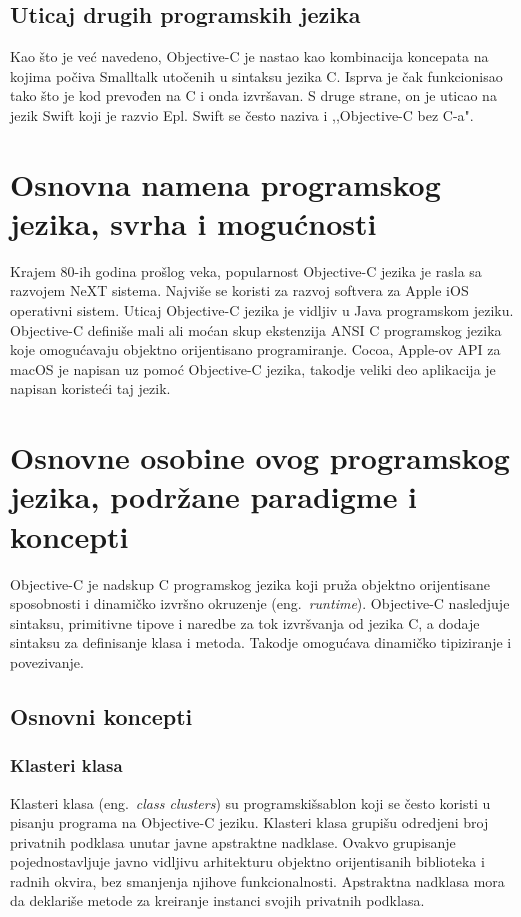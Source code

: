 \documentclass[a4paper]{article}
\begin{document}
\subsection{Uticaj drugih programskih jezika}
\label{subsec:uticaj}
Kao što je već navedeno, Objective-C je nastao kao kombinacija koncepata na kojima počiva Smalltalk utočenih u sintaksu jezika C. Isprva je čak funkcionisao tako što je kod prevođen na C i onda izvršavan. S druge strane, on je uticao na jezik Swift koji je razvio Epl. Swift se često naziva i ,,Objective-C bez C-a". 

\section{Osnovna namena programskog jezika, svrha i mogućnosti}
\label{sec:namena}
Krajem 80-ih godina prošlog veka, popularnost Objective-C jezika je rasla sa razvojem NeXT sistema. Najviše se koristi za razvoj softvera za Apple iOS operativni sistem. Uticaj Objective-C jezika je vidljiv u Java programskom jeziku.
Objective-C definiše mali ali moćan skup ekstenzija ANSI C programskog jezika koje omogućavaju objektno orijentisano programiranje. Cocoa, Apple-ov API za macOS je napisan uz pomoć Objective-C jezika, takodje veliki deo aplikacija je napisan koristeći taj jezik. 

\section{Osnovne osobine ovog programskog jezika, podržane paradigme i koncepti}
\label{sec:osobine}
Objective-C je nadskup C programskog jezika koji pruža objektno orijentisane sposobnosti i dinamičko izvršno okruzenje (eng.~{\em runtime}). Objective-C nasledjuje sintaksu, primitivne tipove i naredbe za tok izvršvanja od jezika C, a dodaje sintaksu za definisanje klasa i metoda. Takodje omogućava dinamičko tipiziranje i povezivanje.
\subsection{Osnovni koncepti}
\subsubsection{Klasteri klasa}
Klasteri klasa (eng.~{\em class clusters}) su programskišsablon koji se često koristi u pisanju programa na Objective-C jeziku. Klasteri klasa grupišu odredjeni broj privatnih podklasa unutar javne apstraktne nadklase. 
Ovakvo grupisanje pojednostavljuje javno vidljivu arhitekturu objektno orijentisanih biblioteka i radnih okvira, bez smanjenja njihove funkcionalnosti. Apstraktna nadklasa mora da deklariše metode za kreiranje instanci svojih privatnih podklasa. 
\end{document}
